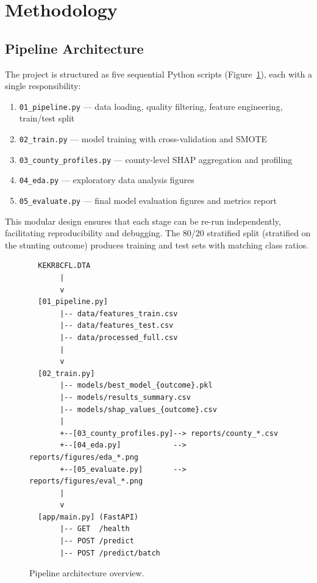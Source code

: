 \documentclass[12pt, a4paper]{article}
\begin{document}
\section{Methodology}
\label{sec:methods}

\subsection{Pipeline Architecture}
The project is structured as five sequential Python scripts
(Figure~\ref{fig:pipeline_arch}), each with a single responsibility:

\begin{enumerate}[noitemsep]
    \item \texttt{01\_pipeline.py} — data loading, quality filtering, feature engineering, train/test split
    \item \texttt{02\_train.py} — model training with cross-validation and SMOTE
    \item \texttt{03\_county\_profiles.py} — county-level SHAP aggregation and profiling
    \item \texttt{04\_eda.py} — exploratory data analysis figures
    \item \texttt{05\_evaluate.py} — final model evaluation figures and metrics report
\end{enumerate}

This modular design ensures that each stage can be re-run independently,
facilitating reproducibility and debugging. The 80/20 stratified split
(stratified on the stunting outcome) produces training and test sets
with matching class ratios.

\begin{figure}[H]
    \centering
    \begin{minipage}{0.9\textwidth}
    \begin{verbatim}
  KEKR8CFL.DTA
       |
       v
  [01_pipeline.py]
       |-- data/features_train.csv
       |-- data/features_test.csv
       |-- data/processed_full.csv
       |
       v
  [02_train.py]
       |-- models/best_model_{outcome}.pkl
       |-- models/results_summary.csv
       |-- models/shap_values_{outcome}.csv
       |
       +--[03_county_profiles.py]--> reports/county_*.csv
       +--[04_eda.py]            --> reports/figures/eda_*.png
       +--[05_evaluate.py]       --> reports/figures/eval_*.png
       |
       v
  [app/main.py] (FastAPI)
       |-- GET  /health
       |-- POST /predict
       |-- POST /predict/batch
    \end{verbatim}
    \end{minipage}
    \caption{Pipeline architecture overview.}
    \label{fig:pipeline_arch}
\end{figure}
\end{document}
